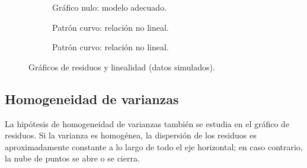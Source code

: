 \begin{figure}[H]
  \centering
  \begin{subfigure}[t]{0.32\linewidth}
    \centering
    \caption{Gráfico nulo: modelo adecuado.}
  \end{subfigure}\hfill
  \begin{subfigure}[t]{0.32\linewidth}
    \centering
    \caption{Patrón curvo: relación no lineal.}
  \end{subfigure}\hfill
  \begin{subfigure}[t]{0.32\linewidth}
    \centering
    \caption{Patrón curvo: relación no lineal.}
  \end{subfigure}
  \caption{Gráficos de residuos y linealidad (datos simulados).}
\end{figure}

\subsection{Homogeneidad de varianzas}

La hipótesis de homogeneidad de varianzas también se estudia en el gráfico de residuos. Si la
varianza es homogénea, la dispersión de los residuos es aproximadamente constante a lo largo de
todo el eje horizontal; en caso contrario, la nube de puntos se abre o se cierra.

